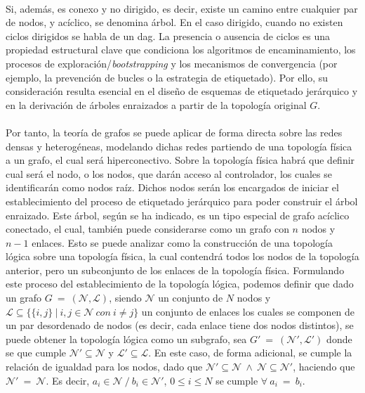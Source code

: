 \\
Si, además, es conexo y no dirigido, es decir, existe un camino entre cualquier par de nodos, y acíclico, se denomina árbol. En el caso dirigido, cuando no existen ciclos dirigidos se habla de un \gls{dag}. La presencia o ausencia de ciclos es una propiedad estructural clave que condiciona los algoritmos de encaminamiento, los procesos de exploración/\textit{bootstrapping} y los mecanismos de convergencia (por ejemplo, la prevención de bucles o la estrategia de etiquetado). Por ello, su consideración resulta esencial en el diseño de esquemas de etiquetado jerárquico y en la derivación de árboles enraizados a partir de la topología original \(G\).\\
\\
Por tanto, la teoría de grafos se puede aplicar de forma directa sobre las redes densas y heterogéneas, modelando dichas redes partiendo de una topología física a un grafo, el cual será hiperconectivo. Sobre la topología física habrá que definir cual será el nodo, o los nodos, que darán acceso al controlador, los cuales se identificarán como nodos raíz. Dichos nodos serán los encargados de iniciar el establecimiento del proceso de etiquetado jerárquico para poder construir el árbol enraizado. Este árbol, según se ha indicado, es un tipo especial de grafo acíclico conectado, el cual, también puede considerarse como un grafo con $n$ nodos y $n-1$ enlaces. Esto se puede analizar como la construcción de una topología lógica sobre una topología física, la cual contendrá todos los nodos de la topología anterior, pero un subconjunto de los enlaces de la topología física. Formulando este proceso del establecimiento de la topología lógica, podemos definir que dado un grafo $G \: = \: (\mathcal{N}, \mathcal{L})$, siendo  $\mathcal{N}$ un conjunto de $N$ nodos y $\mathcal{L} \subseteq \{\{i,j\} \: | \: i,j \in \mathcal{N} \: con \: i \neq j\}$ un conjunto de enlaces los cuales se componen de un par desordenado de nodos (es decir, cada enlace tiene dos nodos distintos), se puede obtener la topología lógica como un subgrafo, sea $G' \: = \: (\mathcal{N}', \mathcal{L}')$ donde se que cumple $\mathcal{N}' \subseteq \mathcal{N}$ y $\mathcal{L}' \subseteq \mathcal{L}$. En este caso, de forma adicional, se cumple la relación de igualdad para los nodos, dado que $\mathcal{N}' \subseteq \mathcal{N} \: \wedge \: \mathcal{N} \subseteq \mathcal{N}' $, haciendo que $\mathcal{N}' \: = \: \mathcal{N}$. Es decir, $a_{i} \in \mathcal{N} \: / \: b_{i} \in \mathcal{N}'$, $0 \leq i \leq N$ se cumple $\forall \: a_{i} \: = \: b_{i}$.\\
